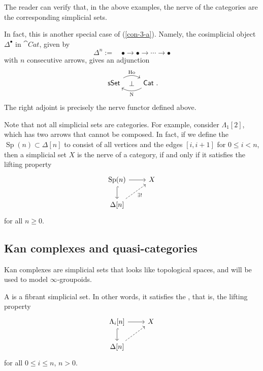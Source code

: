 The reader can verify that, in the above examples,
the nerve of the categories are the corresponding simplicial sets.

\begin{remark}
    In fact, this is another special case of (\ref{con-3-a}).
    Namely, the cosimplicial object $\Delta^\bullet$ in $\cat{Cat}$, given by 
    \[\Delta^n:=\quad\bullet\to\bullet\to\cdots\to\bullet\]
    with $n$ consecutive arrows, gives an adjunction
    \[\begin{tikzcd}
        \cat{sSet}\ar[r,bend left=30,"\Ho"]\ar[r,phantom,"\bot"] &
        \rlap{$\cat{Cat}$\ .}\phantom{\cat{sSet}}\ar[l,bend left=30,"\operatorname{N}"]
    \end{tikzcd}\]
    The right adjoint is precisely the nerve functor defined above. \varqed
\end{remark}

Note that not all simplicial sets are categories.
For example, consider $\Lambda_1[2]$, which has two arrows that cannot be composed.
In fact, if we define the  $\operatorname{Sp}(n)\subset\Delta[n]$
to consist of all vertices and the edges $[i,i+1]$ for $0\leq i<n$,
then a simplicial set $X$ is the nerve of a category,
if and only if it satisfies the lifting property
\[\begin{tikzcd}
    \operatorname{Sp}(n)\ar[d,hook]\ar[r] & X \\
    \Delta[n]\ar[ur,dashed,"\exists!"']
\end{tikzcd}\]
for all $n\geq 0$.

\subsection{Kan complexes and quasi-categories}

Kan complexes are simplicial sets that looks like topological spaces,
and will be used to model $\infty$-groupoids.

\begin{definition}
    A  is a fibrant simplicial set.
    In other words, it satisfies the ,
    that is, the lifting property
    \[\begin{tikzcd}
        \Lambda_i[n]\ar[d,hook]\ar[r] & X \\
        \Delta[n]\ar[ur,dashed]
    \end{tikzcd}\]
    for all $0\leq i\leq n$, $n>0$.
\end{definition}



